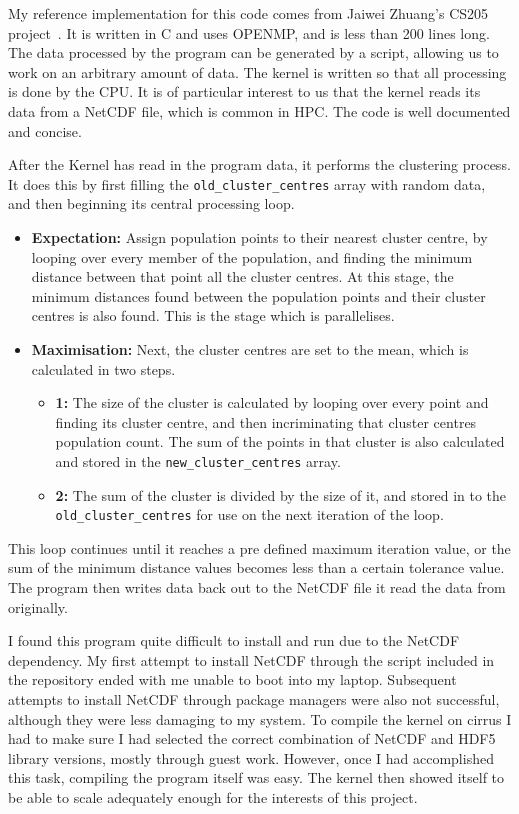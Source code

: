 My reference implementation for this code comes from Jaiwei Zhuang's CS205 project~\cite{CS205}. It is written in C and uses OPENMP, and is less than 200 lines long. The data processed by the program can be generated by a script, allowing us to work on an arbitrary amount of data. The kernel is written so that all processing is done by the CPU. It is of particular interest to us that the kernel reads its data from a NetCDF file, which is common in HPC. The code is well documented and concise.

After the Kernel has read in the program data, it performs the clustering process. It does this by first filling the \texttt{old\_cluster\_centres} array with random data, and then beginning its central processing loop.
\begin{itemize}
  \item \textbf{Expectation:} Assign population points to their nearest cluster centre, by looping over every member of the population, and finding the minimum distance between that point all the cluster centres. At this stage, the minimum distances found between the population points and their cluster centres is also found. This is the stage which is parallelises.
  \item \textbf{Maximisation:} Next, the cluster centres are set to the mean, which is calculated in two steps.
  \begin{itemize}
    \item \textbf{1:} The size of the cluster is calculated by looping over every point and finding its cluster centre, and then incriminating that cluster centres population count. The sum of the points in that cluster is also calculated and stored in the \texttt{new\_cluster\_centres} array.
   \item \textbf{ 2:} The sum of the cluster is divided by the size of it, and stored in to the \texttt{old\_cluster\_centres} for use on the next iteration of the loop.
   \end{itemize}
\end{itemize}
This loop continues until it reaches a pre defined maximum iteration value, or the sum of the minimum distance values becomes less than a certain tolerance value. The program then writes data back out to the NetCDF file it read the data from originally.

I found this program quite difficult to install and run due to the NetCDF dependency. My first attempt to install NetCDF through the script included in the repository ended with me unable to boot into my laptop. Subsequent attempts to install NetCDF through package managers were also not successful, although they were less damaging to my system. To compile the kernel on cirrus I had to make sure I had selected the correct combination of NetCDF and HDF5 library versions, mostly through guest work. However, once I had accomplished this task, compiling the program itself was easy. The kernel then showed itself to be able to scale adequately enough for the interests of this project.
